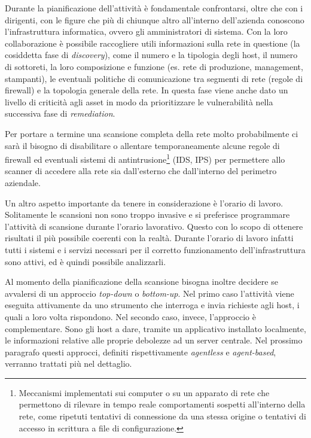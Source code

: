 \documentclass[target=bach,aauheader=]{thud}
\begin{document}
Durante la pianificazione dell’attività è fondamentale confrontarsi, oltre che con i dirigenti, con le figure che più di chiunque altro all’interno dell’azienda conoscono l’infrastruttura informatica, ovvero gli amministratori di sistema. Con la loro collaborazione è possibile raccogliere utili informazioni sulla rete in questione (la cosiddetta fase di \textit{discovery}), come il numero e la tipologia degli host, il numero di sottoreti, la loro composizione e funzione (es. rete di produzione, management, stampanti), le eventuali politiche di comunicazione tra segmenti di rete (regole di firewall) e la topologia generale della rete. In questa fase viene anche dato un livello di criticità agli asset in modo da prioritizzare le vulnerabilità nella successiva fase di \textit{remediation}.

Per portare a termine una scansione completa della rete molto probabilmente ci sarà il bisogno di disabilitare o allentare temporaneamente alcune regole di firewall ed eventuali sistemi di antintrusione\footnote{Meccanismi implementati sui computer o su un apparato di rete che permettono di rilevare in tempo reale comportamenti sospetti all’interno della rete, come ripetuti tentativi di connessione da una stessa origine o tentativi di accesso in scrittura a file di configurazione.} (IDS, IPS) per permettere allo scanner di accedere alla rete sia dall’esterno che dall’interno del perimetro aziendale. 

Un altro aspetto importante da tenere in considerazione è l’orario di lavoro. Solitamente le scansioni non sono troppo invasive e si preferisce programmare l'attività di scansione durante l'orario lavorativo. Questo con lo scopo di ottenere risultati il più possibile coerenti con la realtà. Durante l'orario di lavoro infatti tutti i sistemi e i servizi necessari per il corretto funzionamento dell'infrastruttura sono attivi, ed è quindi possibile analizzarli.

Al momento della pianificazione della scansione bisogna inoltre decidere se avvalersi di un approccio \textit{top-down} o \textit{bottom-up}. Nel primo caso l’attività viene eseguita attivamente da uno strumento che interroga e invia richieste agli host, i quali a loro volta rispondono. Nel secondo caso, invece, l’approccio è complementare. Sono gli host a dare, tramite un applicativo installato localmente, le informazioni relative alle proprie debolezze ad un server centrale. Nel prossimo paragrafo questi approcci, definiti rispettivamente \textit{agentless} e \textit{agent-based}, verranno trattati più nel dettaglio.
\end{document}
